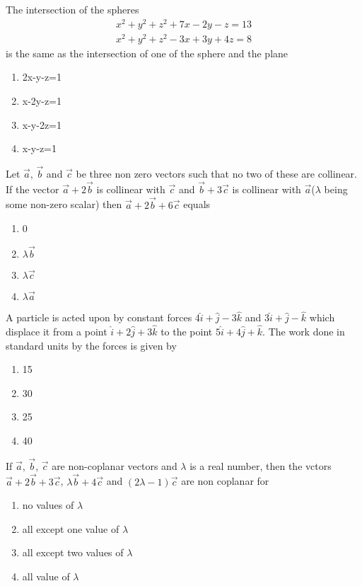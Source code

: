 \item The intersection of the spheres
\begin{align}
x^2+y^2+z^2+7x-2y-z=13
\end{align}
\begin{align}
x^2+y^2+z^2-3x+3y+4z=8
\end{align}
is the same as the intersection of one of the sphere and the plane
\begin{enumerate}
\item 2x-y-z=1
\item x-2y-z=1
\item x-y-2z=1
\item x-y-z=1
\end{enumerate}

\item Let $\overrightarrow{a}$, $\overrightarrow{b}$ and $\overrightarrow{c}$ be three non zero vectors such that no two of these are collinear. If the vector $\overrightarrow{a}+2\overrightarrow{b}$ is collinear with $\overrightarrow{c}$ and $\overrightarrow{b}+3\overrightarrow{c}$ is collinear with $\overrightarrow{a}$($\lambda$ being some non-zero scalar) then $\overrightarrow{a}+2\overrightarrow{b}+6\overrightarrow{c}$ equals
\begin{enumerate}
\item 0
\item $\lambda\overrightarrow{b}$
\item $\lambda\overrightarrow{c}$
\item $\lambda\overrightarrow{a}$
\end{enumerate}

\item A particle is acted upon by constant forces $4\hat{i}+\hat{j}-3\hat{k}$ and $3\hat{i}+\hat{j}-\hat{k}$ which displace it from a point $\hat{i}+2\hat{j}+3\hat{k}$ to the point $5\hat{i}+4\hat{j}+\hat{k}$. The work done in standard units by the forces is given by
\begin{enumerate}
\item 15
\item 30
\item 25
\item 40
\end{enumerate}

\item If $\overrightarrow{a}$, $\overrightarrow{b}$, $\overrightarrow{c}$ are non-coplanar vectors and $\lambda$ is a real number, then the vctors $\overrightarrow{a}+2\overrightarrow{b}+3\overrightarrow{c}$, $\lambda\overrightarrow{b}+4\overrightarrow{c}$ and $(2\lambda-1)\overrightarrow{c}$ are non coplanar for
\begin{enumerate}
\item no values of $\lambda$
\item all except one value of $\lambda$
\item all except two values of $\lambda$
\item all value of $\lambda$
\end{enumerate}

